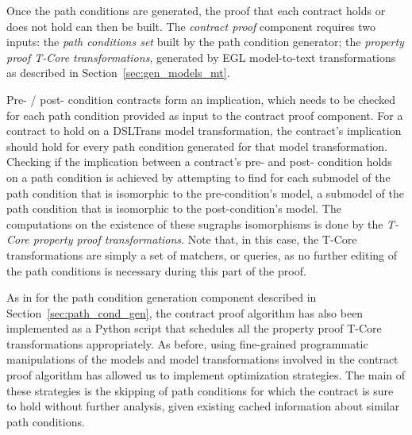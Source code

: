 Once the path conditions are generated, the proof that each
contract holds or does not hold can then be built. The \emph{contract proof}
component requires two inputs: the \emph{path conditions set} built by the path
condition generator; the \emph{property proof T-Core transformations}, generated by EGL model-to-text
transformations as described in Section~\ref{sec:gen_models_mt}.

Pre- / post- condition contracts form an implication, which needs to be
checked for each path condition provided as input to the contract proof
component. For a contract to hold on a DSLTrans model transformation, the
contract's implication should hold for every path condition generated for
that model transformation. Checking if the implication between a contract's pre-
and post- condition holds on a path condition is achieved by attempting to find for each submodel of
the path condition that is isomorphic to the pre-condition's model, a submodel
of the path condition that is isomorphic to the post-condition's model. The
computations on the existence of these sugraphs isomorphisms is done by
the \emph{T-Core property proof transformations}. Note that, in this case, the
T-Core transformations are simply a set of matchers, or queries, as no further
editing of the path conditions is necessary during this part of the proof.

As in for the path condition generation component described in
Section~\ref{sec:path_cond_gen}, the contract proof algorithm has also been
implemented as a Python script that schedules all the property proof T-Core
transformations appropriately. As before, using fine-grained programmatic
manipulations of the models and model transformations involved in the contract
proof algorithm has allowed us to implement optimization strategies. The main
of these strategies is the skipping of path conditions for which the contract
is sure to hold without further analysis, given existing cached information
about similar path conditions.


